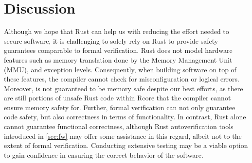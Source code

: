
\chapter{Discussion}
\label{sec:discussion}

Although we hope that Rust can help us with reducing the effort needed to secure
software, it is challenging to solely rely on Rust to provide safety guarantees
comparable to formal verification. Rust does not model hardware features
such as memory translation done by the Memory Management Unit (MMU), and
exception levels. Consequently, when building software on top of these features,
the compiler cannot check for misconfiguration or logical errors.
Moreover, \rustcore{} is not guaranteed to be memory safe despite our best
efforts, as there are still portions of unsafe Rust code within Rcore that the
compiler cannot ensure memory safety for.
Further, formal verification can not only guarantee code safety, but also
correctness in terms of functionality.
In contrast, Rust alone cannot guarantee functional correctness, although Rust
autoverification tools introduced in \autoref{sec:fw} may offer some assistance
in this regard, albeit not to the extent of formal verification.
Conducting extensive testing may be a viable option to gain confidence in
ensuring the correct behavior of the software.
